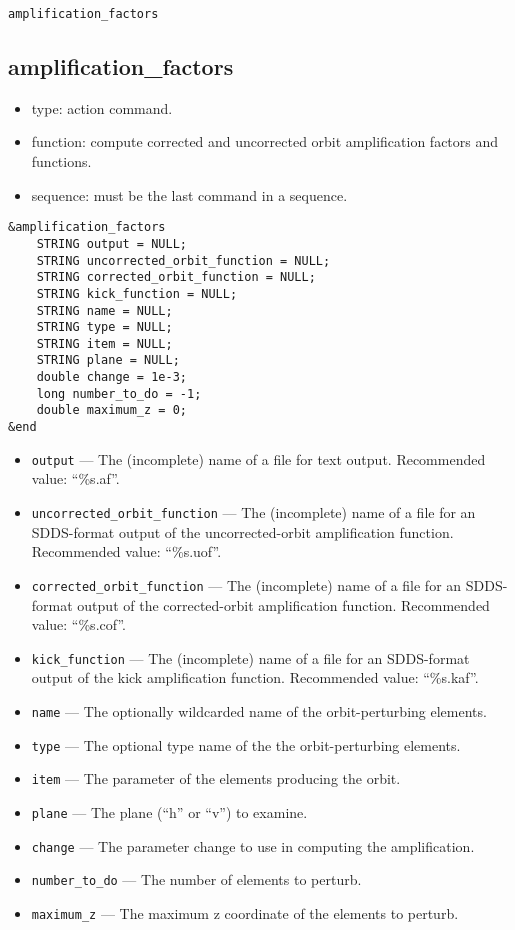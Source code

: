 \documentclass[11pt]{article}
\begin{document}
\newpage
\begin{center}{\Large\verb|amplification_factors|}\end{center}
\subsection{amplification\_factors \label{subsec:amplificationfactors}}

\begin{itemize}
\item type: action command.
\item function: compute corrected and uncorrected orbit amplification factors and functions.
\item sequence: must be the last command in a sequence.
\end{itemize}

\begin{verbatim}
&amplification_factors
    STRING output = NULL;
    STRING uncorrected_orbit_function = NULL;
    STRING corrected_orbit_function = NULL;
    STRING kick_function = NULL;
    STRING name = NULL;
    STRING type = NULL;
    STRING item = NULL;
    STRING plane = NULL;
    double change = 1e-3;
    long number_to_do = -1;
    double maximum_z = 0;
&end
\end{verbatim}

\begin{itemize}
\item \verb|output| ---  The (incomplete) name of a file for text output.   Recommended value: ``\%s.af''.
\item \verb|uncorrected_orbit_function| --- The (incomplete) name of a file for an SDDS-format output of the
    uncorrected-orbit amplification function.  Recommended value: ``\%s.uof''.
\item \verb|corrected_orbit_function| --- The (incomplete) name of a file for an SDDS-format output of the
    corrected-orbit amplification function.  Recommended value: ``\%s.cof''.
\item \verb|kick_function| --- The (incomplete) name of a file for an SDDS-format output of the kick amplification function.
Recommended value: ``\%s.kaf''.
\item \verb|name| --- The optionally wildcarded name of the orbit-perturbing elements.  
\item \verb|type| --- The optional type name of the the orbit-perturbing elements.
\item \verb|item| --- The parameter of the elements producing the orbit.
\item \verb|plane| --- The plane (``h'' or ``v'') to examine.
\item \verb|change| --- The parameter change to use in computing the amplification.  
\item \verb|number_to_do| --- The number of elements to perturb.
\item \verb|maximum_z| --- The maximum z coordinate of the elements to perturb.
\end{itemize}
\end{document}
